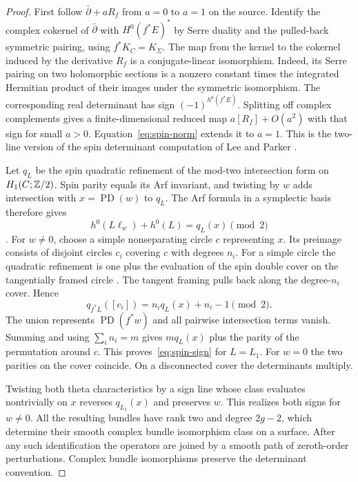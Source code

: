 \begin{proof}
First follow $\bar\partial+aR_f$ from $a=0$ to $a=1$ on the source.
Identify the complex cokernel of $\bar\partial$ with
$H^0(f^*E)^*$ by Serre duality and the pulled-back symmetric pairing,
using $f^*K_C=K_\Sigma$. The map from the kernel to the cokernel
induced by the derivative $R_f$ is a conjugate-linear isomorphism.
Indeed, its Serre pairing on two holomorphic sections is a nonzero
constant times the integrated Hermitian product of their images under
the symmetric isomorphism. The corresponding real determinant has
sign $(-1)^{h^0(f^*E)}$. Splitting off complex complements gives a
finite-dimensional reduced map $a[R_f]+O(a^2)$ with that sign for
small $a>0$. Equation~\eqref{eq:spin-norm} extends it to $a=1$.
This is the two-line version of the spin determinant computation
of Lee and Parker \cite[Theorem~3.1]{lp}.

Let $q_L$ be the spin quadratic refinement of the mod-two intersection
form on $H_1(C;\mathbb Z/2)$. Spin parity equals its Arf invariant, and
twisting by $w$ adds intersection with $x=\operatorname{PD}(w)$
to $q_L$. The Arf formula in a symplectic basis therefore gives
\[
       h^0(L\ell_w)+h^0(L)=q_L(x)\pmod2
\]
\cite{atiyah,johnson}. For $w\ne0$, choose a simple nonseparating
circle $c$ representing $x$. Its preimage consists of disjoint
circles $c_i$ covering $c$ with degrees $n_i$. For a simple circle
the quadratic refinement is one plus the evaluation of the spin
double cover on the tangentially framed circle
\cite[Theorems~1A and~3A]{johnson}. The tangent framing pulls back
along the degree-$n_i$ cover. Hence
\[
       q_{f^*L}([c_i])=n_i q_L(x)+n_i-1\pmod2 .
\]
The union represents $\operatorname{PD}(f^*w)$ and all pairwise
intersection terms vanish. Summing and using $\sum_i n_i=m$ gives
$m q_L(x)$ plus the parity of the permutation around $c$.
This proves~\eqref{eq:spin-sign} for $L=L_1$. For $w=0$ the two
parities on the cover coincide. On a disconnected cover the
determinants multiply.

Twisting both theta characteristics by a sign line whose class
evaluates nontrivially on $x$ reverses $q_{L_1}(x)$ and preserves
$w$. This realizes both signs for $w\ne0$. All the resulting bundles
have rank two and degree $2g-2$, which determine their smooth
complex bundle isomorphism class on a surface. After any such
identification the operators are joined by a smooth path of
zeroth-order perturbations. Complex bundle isomorphisms preserve
the determinant convention.
\end{proof}

